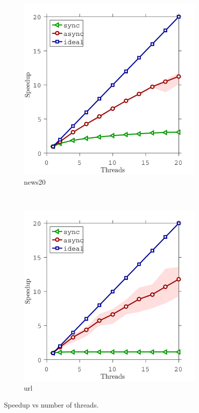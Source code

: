 \begin{figure}[!h]
        \centering
       \begin{subfigure}[b]{0.35\textwidth}
                \includegraphics[width=\textwidth]{./figs/news20_speedup}
                \caption{news20}
        \end{subfigure}
        ~~
        \begin{subfigure}[b]{0.35\textwidth}
                \includegraphics[width=\textwidth]{./figs/url_speedup}
                \caption{url}
        \end{subfigure}        
        \caption{Speedup vs number of threads.}\label{fig:log_reg_speedup}
\end{figure}
